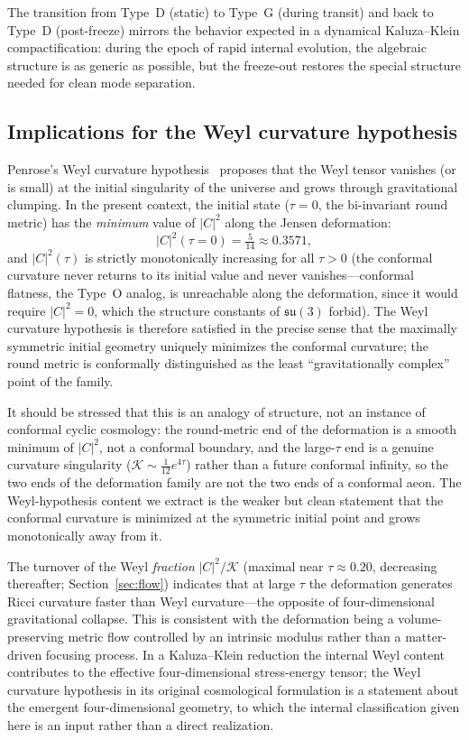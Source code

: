 \documentclass[12pt]{article}
\theoremstyle{definition}
\theoremstyle{remark}
\begin{document}
The transition from Type~D (static) to Type~G (during transit) and back to Type~D (post-freeze) mirrors the behavior expected in a dynamical Kaluza--Klein compactification: during the epoch of rapid internal evolution, the algebraic structure is as generic as possible, but the freeze-out restores the special structure needed for clean mode separation.

\subsection{Implications for the Weyl curvature hypothesis}

Penrose's Weyl curvature hypothesis~\cite{Penrose2010CCC} proposes that the Weyl tensor vanishes (or is small) at the initial singularity of the universe and grows through gravitational clumping.  In the present context, the initial state ($\tau=0$, the bi-invariant round metric) has the \emph{minimum} value of $|C|^2$ along the Jensen deformation:
\begin{equation}
|C|^2(\tau=0) = \tfrac{5}{14} \approx 0.3571,
\end{equation}
and $|C|^2(\tau)$ is strictly monotonically increasing for all $\tau>0$ (the conformal curvature never returns to its initial value and never vanishes---conformal flatness, the Type~O analog, is unreachable along the deformation, since it would require $|C|^2=0$, which the structure constants of $\mathfrak{su}(3)$ forbid).  The Weyl curvature hypothesis is therefore satisfied in the precise sense that the maximally symmetric initial geometry uniquely minimizes the conformal curvature; the round metric is conformally distinguished as the least ``gravitationally complex'' point of the family.

It should be stressed that this is an analogy of structure, not an instance of conformal cyclic cosmology: the round-metric end of the deformation is a smooth minimum of $|C|^2$, not a conformal boundary, and the large-$\tau$ end is a genuine curvature singularity ($\mathcal{K}\sim\tfrac{1}{12}e^{4\tau}$) rather than a future conformal infinity, so the two ends of the deformation family are not the two ends of a conformal aeon.  The Weyl-hypothesis content we extract is the weaker but clean statement that the conformal curvature is minimized at the symmetric initial point and grows monotonically away from it.

The turnover of the Weyl \emph{fraction} $|C|^2/\mathcal{K}$ (maximal near $\tau\approx0.20$, decreasing thereafter; Section~\ref{sec:flow}) indicates that at large $\tau$ the deformation generates Ricci curvature faster than Weyl curvature---the opposite of four-dimensional gravitational collapse.  This is consistent with the deformation being a volume-preserving metric flow controlled by an intrinsic modulus rather than a matter-driven focusing process.  In a Kaluza--Klein reduction the internal Weyl content contributes to the effective four-dimensional stress-energy tensor; the Weyl curvature hypothesis in its original cosmological formulation is a statement about the emergent four-dimensional geometry, to which the internal classification given here is an input rather than a direct realization.
\end{document}
